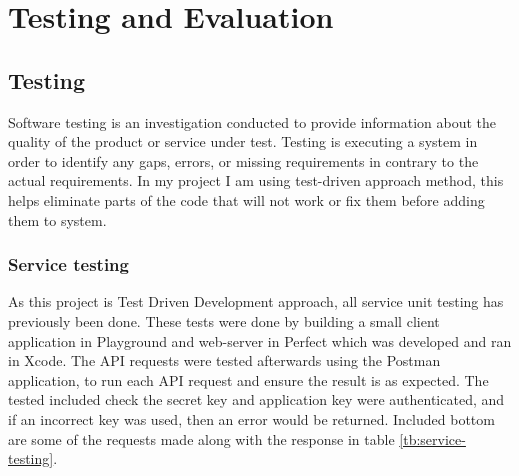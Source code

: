 \chapter{Testing and Evaluation}

\section{Testing}

Software testing is an investigation conducted to provide information about the quality of the product or service under test. Testing is executing a system in order to identify any gaps, errors, or missing requirements in contrary to the actual requirements. In my project I am using test-driven approach method, this helps eliminate parts of the code that will not work or fix them before adding them to system.

\subsection{Service testing}

As this project is Test Driven Development approach, all service unit testing has previously been done. These tests were done by building a small client application in Playground and web-server in Perfect which was developed and ran in Xcode. The API requests were tested afterwards using the Postman application, to run each API request and ensure the result is as expected. The tested included check the secret key and application key were authenticated, and if an incorrect key was used, then an error would be returned. Included bottom are some of the requests made along with the response in table \ref{tb:service-testing}.

